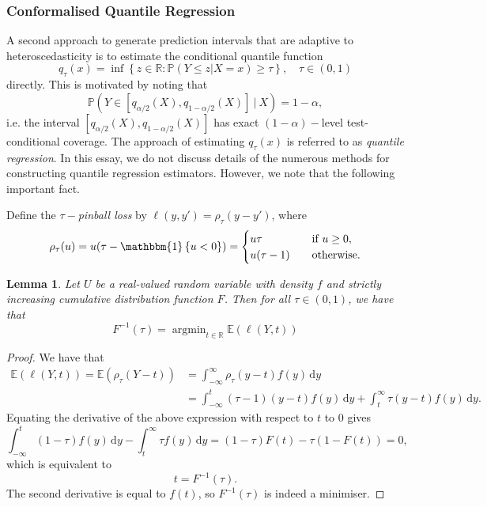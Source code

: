 \documentclass[11pt, titlepage]{article} %
\DeclareMathOperator*{\argmin}{argmin}
\newcommand{\R}{\mathrm}
\newcommand{\Prob}[1]{\mathbb{P}\left( #1 \right)}
\newcommand{\Exp}[3]{\mathbb{E}\left#2 #1 \right#3}
\newcommand{\Ind}[1]{\mathbbm{1}\left\{ #1 \right\}}
\numberwithin{equation}{section}
\newtheorem{lemma}{Lemma}
\theoremstyle{definition}
\numberwithin{theorem}{section}
\numberwithin{lemma}{section}
\numberwithin{corollary}{section}
\numberwithin{proposition}{section}
\numberwithin{definition}{section}
\numberwithin{remark}{section}
\begin{document}
\subsubsection{Conformalised Quantile Regression}

A second approach to generate prediction intervals that are adaptive to heteroscedasticity is to estimate the conditional quantile function \begin{equation}
    q_{\tau}(x) = \inf \left\{ z \in \mathbb{R}: \Prob{Y \leq z | X = x} \geq \tau \right\}, \quad \tau \in (0,1)
\end{equation} directly. This is motivated by noting that \[\Prob{Y \in [q_{\alpha/2}(X), q_{1-\alpha/2}(X)] \ | \  X} = 1-\alpha,\] i.e. the interval \([q_{\alpha/2}(X), q_{1-\alpha/2}(X)]\) has exact \((1-\alpha)-\)level test-conditional coverage. The approach of estimating \(q_\tau(x)\) is referred to as \textit{quantile regression}. In this essay, we do not discuss details of the numerous methods for constructing quantile regression estimators. However, we note that the following important fact. \vskip5pt

\noindent
Define the \(\tau-\)\textit{pinball loss} by \(\ell(y, y') = \rho_\tau(y - y')\), where \[\rho_\tau(u) = u(\tau - \Ind{u < 0} ) = \begin{cases}
    u\tau &\quad \text{if } u \geq 0, \\
    u(\tau - 1) &\quad \text{otherwise.}
\end{cases}\]

\begin{lemma}
    Let \(U\) be a real-valued random variable with density \(f\) and strictly increasing cumulative distribution function \(F\). Then for all \(\tau \in (0,1)\), we have that \[F^{-1}(\tau) = \argmin_{t \in \mathbb{R}} \Exp{\ell(Y,t)}{(}{)}\] 
\end{lemma}
\begin{proof}
    We have that \begin{align*}
        \Exp{\ell(Y,t)}{(}{)} = \Exp{\rho_\tau(Y-t)}{(}{)} &= \int_{-\infty}^\infty \rho_\tau(y-t) f(y) \, \R{d}y \\
        &= \int_{-\infty}^t (\tau-1) (y-t) f(y) \, \R{d}y + \int_t^\infty \tau(y-t) f(y) \, \R{d}y.
    \end{align*}
    Equating the derivative of the above expression with respect to \(t\) to \(0\) gives \[\int_{-\infty}^t (1-\tau) f(y) \, \R{d}y - \int_t^\infty \tau f(y) \, \R{d}y = (1-\tau)F(t) - \tau(1-F(t))  =  0,\] which is equivalent to \[t = F^{-1}(\tau).\] The second derivative is equal to \(f(t)\), so \(F^{-1}(\tau)\) is indeed a minimiser.
\end{proof}
\end{document}

